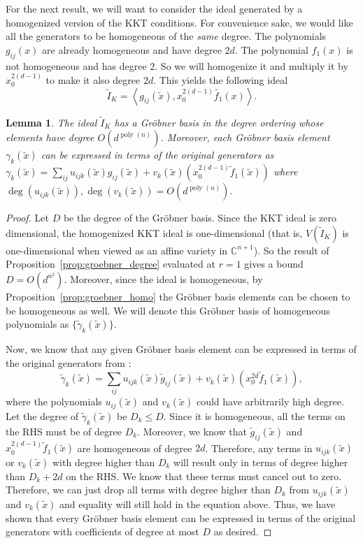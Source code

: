 \documentclass[aps,pra,notitlepage,preprintnumbers,11pt,tightenlines]{revtex4-1}
\newcommand{\CC}{\mathbb{C}}
\DeclareMathOperator{\poly}{poly}
\newtheorem{lemma}[theorem]{Lemma}
\begin{document}
For the next result, we will want to consider the ideal generated by a
homogenized version of the KKT conditions. For convenience sake, we
would like all the generators to be homogeneous of the \emph{same}
degree. The polynomials $g_{ij}(x)$ are already homogeneous and have degree
$2d$. The polynomial $f_1(x)$ is not homogeneous and has degree 2. So we
will homogenize it and multiply it by $x_0^{2(d-1)}$ to make it also degree
$2d$. This yields the following ideal
\[ \tilde{I}_K = \left\langle g_{ij}(\tilde{x}), x_0^{2(d-1)} \tilde{f_1}(x) \right\rangle. \]
\begin{lemma}
  The ideal $\tilde{I}_K$ has a Gr\"{o}bner basis in
  the degree ordering whose elements have degree
  $O(d^{\poly(n)})$. Moreover, each Gr\"{o}bner basis element $\gamma_k(\tilde{x})$
  can be expressed in terms of the original generators as $\gamma_k(\tilde{x}) =
  \sum_{ij} u_{ijk}(\tilde{x}) g_{ij}(\tilde{x}) + v_k(\tilde{x})(x_0^{2(d-1)} \tilde{f}_1(\tilde{x}))$ where
    $\deg(u_{ijk}(\tilde{x})), \deg(v_k(\tilde{x})) = O(d^{\poly(n)})$.
    \label{lem:kkt_groebner}
\end{lemma}
\begin{proof}
  Let $D$ be the degree of the Gr\"{o}bner basis.  Since the KKT ideal is zero dimensional, the homogenized KKT ideal
  is one-dimensional (that is, $V(\tilde{I}_K)$ is one-dimensional
  when viewed as an affine variety in $\CC^{n+1}$). So the result of
  Proposition~\ref{prop:groebner_degree} evaluated at $r = 1$ gives
  a bound $D = O(d^{n^2})$.
  Moreover, since
  the ideal is homogeneous, by Proposition~\ref{prop:groebner_homo} the Gr\"{o}bner basis elements can be
  chosen to be homogeneous as well.
  We will denote this Gr\"{o}bner basis of homogeneous polynomials as
  $\{ \tilde{\gamma}_k(\tilde{x}) \}$.

  
  Now, we know that any given Gr\"{o}bner basis element can be
  expressed in terms of the original generators from :
  \[ \tilde{\gamma}_k(\tilde{x}) = \sum_{ij} u_{ijk}(\tilde{x}) \tilde{g}_{ij}(\tilde{x}) +  v_k(\tilde{x}) (x_0^{2d} \tilde{f}_1(\tilde{x})), \]
  where the polynomials $u_{ij}(\tilde{x})$ and $v_k(\tilde{x})$ could have arbitrarily high
  degree. Let the degree of $\tilde{\gamma}_k(\tilde{x})$ be $D_k \leq D$. Since it is
  homogeneous, all the terms on the RHS must be of degree
  $D_k$. Moreover, we know that $\tilde{g}_{ij}(\tilde{x})$ and $x_0^{2(d-1)}
  \tilde{f}_1(\tilde{x})$ are homogeneous of degree $2d$. Therefore, any terms in
  $u_{ijk}(\tilde{x})$ or $v_k(\tilde{x})$ with degree higher than $D_k$ will result only in terms
  of degree higher than $D_k+2d$ on the RHS. We know that these terms
  must cancel out to zero. Therefore, we can just drop all terms with
  degree higher than $D_k$ from $u_{ijk}(\tilde{x})$ and $v_k(\tilde{x})$ and equality will
  still hold in the equation above. Thus, we have shown that every
  Gr\"{o}bner basis element can be expressed in terms of the original
  generators with coefficients of degree at most $D$ as desired.
\end{proof}
\end{document}
